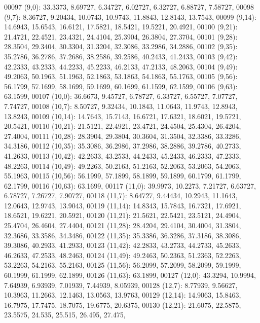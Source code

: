 \begin{DoxyCode}
00097       (9,0): 33.3373, 8.69727, 6.34727, 6.02727, 6.32727, 6.88727, 7.58727,
00098       (9,7): 8.36727, 9.20434, 10.0743, 10.9743, 11.8843, 12.8143, 13.7543,
00099       (9,14): 14.6943, 15.6543, 16.6121, 17.5821, 18.5421, 19.5221, 20.4921,
00100       (9,21): 21.4721, 22.4521, 23.4321, 24.4104, 25.3904, 26.3804, 27.3704,
00101       (9,28): 28.3504, 29.3404, 30.3304, 31.3204, 32.3086, 33.2986, 34.2886,
00102       (9,35): 35.2786, 36.2786, 37.2686, 38.2586, 39.2586, 40.2433, 41.2433,
00103       (9,42): 42.2333, 43.2333, 44.2233, 45.2233, 46.2133, 47.2133, 48.2063,
00104       (9,49): 49.2063, 50.1963, 51.1963, 52.1863, 53.1863, 54.1863, 55.1763,
00105       (9,56): 56.1799, 57.1699, 58.1699, 59.1699, 60.1699, 61.1599, 62.1599,
00106       (9,63): 63.1599,
00107       (10,0): 36.6673, 9.45727, 6.78727, 6.33727, 6.55727, 7.07727, 7.74727,
00108       (10,7): 8.50727, 9.32434, 10.1843, 11.0643, 11.9743, 12.8943, 13.8243,
00109       (10,14): 14.7643, 15.7143, 16.6721, 17.6321, 18.6021, 19.5721, 20.5421,
00110       (10,21): 21.5121, 22.4921, 23.4721, 24.4504, 25.4304, 26.4204, 27.4004,
00111       (10,28): 28.3904, 29.3804, 30.3604, 31.3504, 32.3386, 33.3286, 34.3186,
00112       (10,35): 35.3086, 36.2986, 37.2986, 38.2886, 39.2786, 40.2733, 41.2633,
00113       (10,42): 42.2633, 43.2533, 44.2433, 45.2433, 46.2333, 47.2333, 48.2263,
00114       (10,49): 49.2263, 50.2163, 51.2163, 52.2063, 53.2063, 54.2063, 55.1963,
00115       (10,56): 56.1999, 57.1899, 58.1899, 59.1899, 60.1799, 61.1799, 62.1799,
00116       (10,63): 63.1699,
00117       (11,0): 39.9973, 10.2273, 7.21727, 6.63727, 6.78727, 7.26727, 7.90727,
00118       (11,7): 8.64727, 9.44434, 10.2943, 11.1643, 12.0643, 12.9743, 13.9043,
00119       (11,14): 14.8343, 15.7843, 16.7321, 17.6921, 18.6521, 19.6221, 20.5921,
00120       (11,21): 21.5621, 22.5421, 23.5121, 24.4904, 25.4704, 26.4604, 27.4404,
00121       (11,28): 28.4204, 29.4104, 30.4004, 31.3804, 32.3686, 33.3586, 34.3486,
00122       (11,35): 35.3386, 36.3286, 37.3186, 38.3086, 39.3086, 40.2933, 41.2933,
00123       (11,42): 42.2833, 43.2733, 44.2733, 45.2633, 46.2633, 47.2533, 48.2463,
00124       (11,49): 49.2463, 50.2363, 51.2363, 52.2263, 53.2263, 54.2163, 55.2163,
00125       (11,56): 56.2099, 57.2099, 58.2099, 59.1999, 60.1999, 61.1999, 62.1899,
00126       (11,63): 63.1899,
00127       (12,0): 43.3294, 10.9994, 7.64939, 6.93939, 7.01939, 7.44939, 8.05939,
00128       (12,7): 8.77939, 9.56627, 10.3963, 11.2663, 12.1463, 13.0563, 13.9763,
00129       (12,14): 14.9063, 15.8463, 16.7975, 17.7475, 18.7075, 19.6775, 20.6375,
00130       (12,21): 21.6075, 22.5875, 23.5575, 24.535, 25.515, 26.495, 27.475,

\end{DoxyCode}
